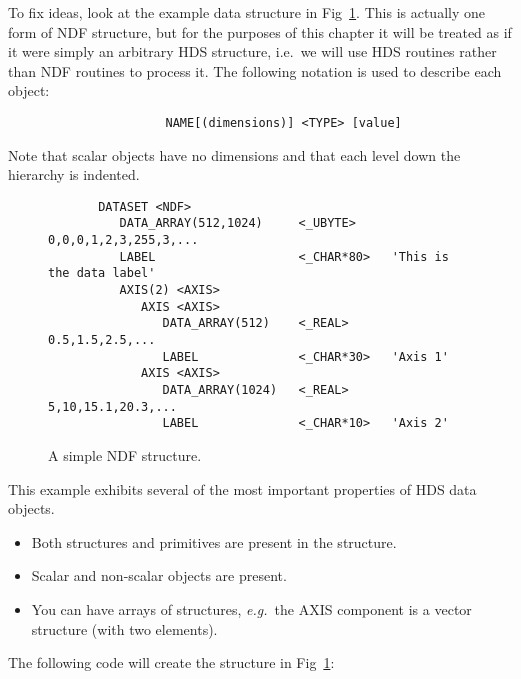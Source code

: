 To fix ideas, look at the example data structure in Fig~\ref{F_exndf}. 
This is actually one form of NDF structure, but for the purposes of this chapter
it will be treated as if it were simply an arbitrary HDS structure, i.e.\ we
will use HDS routines rather than NDF routines to process it.
The following notation is used to describe each object: 

\begin{small}
\begin{verbatim}
                      NAME[(dimensions)] <TYPE> [value]
\end{verbatim}
\end{small}


Note that scalar objects have no dimensions and that each level down the
hierarchy is indented. 

\begin{figure}[htb]

\begin{small}
\begin{verbatim}
       DATASET <NDF>
          DATA_ARRAY(512,1024)     <_UBYTE>     0,0,0,1,2,3,255,3,...
          LABEL                    <_CHAR*80>   'This is the data label'
          AXIS(2) <AXIS>
             AXIS <AXIS>
                DATA_ARRAY(512)    <_REAL>      0.5,1.5,2.5,...
                LABEL              <_CHAR*30>   'Axis 1'
             AXIS <AXIS>
                DATA_ARRAY(1024)   <_REAL>      5,10,15.1,20.3,...
                LABEL              <_CHAR*10>   'Axis 2'
\end{verbatim}
\end{small}

\caption{A simple NDF structure.}
\label{F_exndf}
\end{figure}

This example exhibits several of the most important properties of HDS data
objects.

\begin{itemize}
\item Both structures and primitives are present in the structure.
\item Scalar and non-scalar objects are present.
\item You can have arrays of structures, {\em e.g.}\, the AXIS component is a
 vector structure (with two elements).
\end{itemize}

The following code will create the structure in Fig~\ref{F_exndf}:

